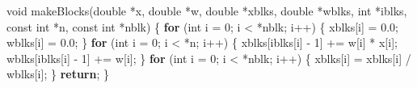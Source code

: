 \documentclass[
  12pt,
  letterpaper,
  DIV=11,
  numbers=noendperiod]{scrreprt}
\newenvironment{Shaded}{\begin{snugshade}}{\end{snugshade}}
\newcommand{\ControlFlowTok}[1]{\textcolor[rgb]{0.00,0.23,0.31}{\textbf{#1}}}
\newcommand{\DataTypeTok}[1]{\textcolor[rgb]{0.68,0.00,0.00}{#1}}
\newcommand{\DecValTok}[1]{\textcolor[rgb]{0.68,0.00,0.00}{#1}}
\newcommand{\FloatTok}[1]{\textcolor[rgb]{0.68,0.00,0.00}{#1}}
\newcommand{\NormalTok}[1]{\textcolor[rgb]{0.00,0.23,0.31}{#1}}
\newcommand{\OperatorTok}[1]{\textcolor[rgb]{0.37,0.37,0.37}{#1}}
\theoremstyle{remark}
\begin{document}
\begin{Shaded}
\begin{Highlighting}[]
\DataTypeTok{void}\NormalTok{ makeBlocks}\OperatorTok{(}\DataTypeTok{double} \OperatorTok{*}\NormalTok{x}\OperatorTok{,} \DataTypeTok{double} \OperatorTok{*}\NormalTok{w}\OperatorTok{,} \DataTypeTok{double} \OperatorTok{*}\NormalTok{xblks}\OperatorTok{,} \DataTypeTok{double} \OperatorTok{*}\NormalTok{wblks}\OperatorTok{,} \DataTypeTok{int} \OperatorTok{*}\NormalTok{iblks}\OperatorTok{,}
                \DataTypeTok{const} \DataTypeTok{int} \OperatorTok{*}\NormalTok{n}\OperatorTok{,} \DataTypeTok{const} \DataTypeTok{int} \OperatorTok{*}\NormalTok{nblk}\OperatorTok{)} \OperatorTok{\{}
    \ControlFlowTok{for} \OperatorTok{(}\DataTypeTok{int}\NormalTok{ i }\OperatorTok{=} \DecValTok{0}\OperatorTok{;}\NormalTok{ i }\OperatorTok{\textless{}} \OperatorTok{*}\NormalTok{nblk}\OperatorTok{;}\NormalTok{ i}\OperatorTok{++)} \OperatorTok{\{}
\NormalTok{        xblks}\OperatorTok{[}\NormalTok{i}\OperatorTok{]} \OperatorTok{=} \FloatTok{0.0}\OperatorTok{;}
\NormalTok{        wblks}\OperatorTok{[}\NormalTok{i}\OperatorTok{]} \OperatorTok{=} \FloatTok{0.0}\OperatorTok{;}
    \OperatorTok{\}}
    \ControlFlowTok{for} \OperatorTok{(}\DataTypeTok{int}\NormalTok{ i }\OperatorTok{=} \DecValTok{0}\OperatorTok{;}\NormalTok{ i }\OperatorTok{\textless{}} \OperatorTok{*}\NormalTok{n}\OperatorTok{;}\NormalTok{ i}\OperatorTok{++)} \OperatorTok{\{}
\NormalTok{        xblks}\OperatorTok{[}\NormalTok{iblks}\OperatorTok{[}\NormalTok{i}\OperatorTok{]} \OperatorTok{{-}} \DecValTok{1}\OperatorTok{]} \OperatorTok{+=}\NormalTok{ w}\OperatorTok{[}\NormalTok{i}\OperatorTok{]} \OperatorTok{*}\NormalTok{ x}\OperatorTok{[}\NormalTok{i}\OperatorTok{];}
\NormalTok{        wblks}\OperatorTok{[}\NormalTok{iblks}\OperatorTok{[}\NormalTok{i}\OperatorTok{]} \OperatorTok{{-}} \DecValTok{1}\OperatorTok{]} \OperatorTok{+=}\NormalTok{ w}\OperatorTok{[}\NormalTok{i}\OperatorTok{];}
    \OperatorTok{\}}
    \ControlFlowTok{for} \OperatorTok{(}\DataTypeTok{int}\NormalTok{ i }\OperatorTok{=} \DecValTok{0}\OperatorTok{;}\NormalTok{ i }\OperatorTok{\textless{}} \OperatorTok{*}\NormalTok{nblk}\OperatorTok{;}\NormalTok{ i}\OperatorTok{++)} \OperatorTok{\{}
\NormalTok{        xblks}\OperatorTok{[}\NormalTok{i}\OperatorTok{]} \OperatorTok{=}\NormalTok{ xblks}\OperatorTok{[}\NormalTok{i}\OperatorTok{]} \OperatorTok{/}\NormalTok{ wblks}\OperatorTok{[}\NormalTok{i}\OperatorTok{];}
    \OperatorTok{\}}
    \ControlFlowTok{return}\OperatorTok{;}
\OperatorTok{\}}


\end{Highlighting}
\end{Shaded}
\end{document}
